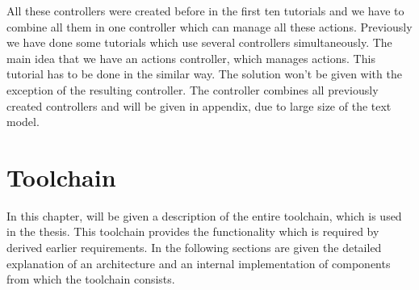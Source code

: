 All these controllers were created before in the first ten tutorials and we have to combine all them in one controller which can manage all these actions. Previously we have done some tutorials which use several controllers simultaneously. The main idea that we have an actions controller, which manages actions. This tutorial has to be done in the similar way. \newline \newline
The solution won't be given with the exception of the resulting controller. The controller combines all previously created controllers and will be given in appendix, due to large size of the text model.
\chapter{Toolchain}
In this chapter, will be given a description of the entire toolchain, which is used in the thesis. This toolchain provides the functionality which is required by derived earlier requirements. In the following sections are given the detailed explanation of an architecture and an internal implementation of components from which the toolchain consists.

